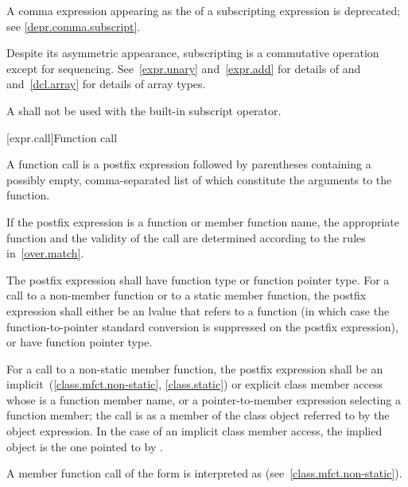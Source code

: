 \pnum
\begin{note}
A comma expression
appearing as the 
of a subscripting expression is deprecated;
see \ref{depr.comma.subscript}.
\end{note}

\pnum
\begin{note}
Despite its asymmetric appearance, subscripting is a commutative
operation except for sequencing.
See~\ref{expr.unary} and~\ref{expr.add} for details of \tcode{*} and
\tcode{+} and~\ref{dcl.array} for details of array types.
\end{note}

\pnum
A  shall not be used with the built-in subscript operator.

[expr.call]{Function call}

\pnum
{}%
%
%
A function call is a postfix expression followed by parentheses
containing a possibly empty, comma-separated list of
 which
constitute the arguments to the function.
\begin{note}
If the postfix expression is a function or member function name,
the appropriate function and the validity of the call
are determined according to the rules in~\ref{over.match}.
\end{note}
The postfix expression shall
have function type or function pointer type.
For a call to a non-member function or to a static member function,
the postfix expression shall either be an lvalue that refers to a
function (in which case the function-to-pointer standard
conversion is suppressed on the postfix expression),
or have function pointer type.

\pnum
For a call to a non-static member function,
the postfix expression shall be an
implicit~(\ref{class.mfct.non-static}, \ref{class.static}) or explicit
class member access whose  is a
function member name, or a pointer-to-member
expression selecting a function member; the call is as a member of
the class object referred to by the
object expression. In the case of an implicit class
member access, the implied object is the one pointed to by .
\begin{note}
A member function call of the form  is interpreted as
 (see~\ref{class.mfct.non-static}).
\end{note}

